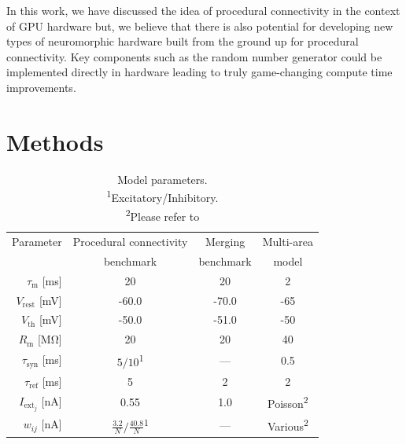 \documentclass[9pt,a4paper]{amsart}
\begin{document}
In this work, we have discussed the idea of procedural connectivity in the context of GPU hardware but, we believe that there is also potential for developing new types of neuromorphic hardware built from the ground up for procedural connectivity.
Key components such as the random number generator could be implemented directly in hardware leading to truly game-changing compute time improvements.
%
\section{Methods}
\begin{table}
  \centering
  \begin{tabular}{r S S S}
    \toprule
        {Parameter}                             & {Procedural connectivity} & {Merging}         & {Multi-area} \\
                                                & {benchmark}               & {benchmark}       & {model} \\
    \midrule
        $\tau_{\text{m}}$ [\si{\milli\second}]         & 20                        & 20                & 2 \\
        $V_{\text{rest}}$ [\si{\milli\volt}]           & -60.0                     & -70.0             & -65 \\
       
        $V_{\text{th}}$ [\si{\milli\volt}]         & -50.0                     & -51.0             & -50 \\
        $R_{\text{m}}$ [\si{\mega\ohm}]                  & 20                        & 20                & 40 \\
        $\tau_{\text{syn}}$ [\si{\milli\second}]       & {$5/10$\textsuperscript{1}} & {---}             & 0.5\\
        $\tau_{\text{ref}}$ [\si{\milli\second}]       & 5                         & 2                 & 2 \\
        $I_{\text{ext}_j}$ [\si{\nano\ampere}]           & 0.55                      & 1.0    & {Poisson\textsuperscript{2}}\\
        $w_{ij}$ [\si{\nano\ampere}]            & {$\frac{3.2}{N}/\frac{40.8}{N}$\textsuperscript{1}}           & {---}            & {Various\textsuperscript{2}}\\
    \bottomrule
  \end{tabular}
  \caption{Model parameters. \\
  \textsuperscript{1}Excitatory/Inhibitory. \\
  \textsuperscript{2}Please refer to \citet[Table 1,2]{Schmidt2018}}
  \label{tab:parameters}
\end{table}
\end{document}
